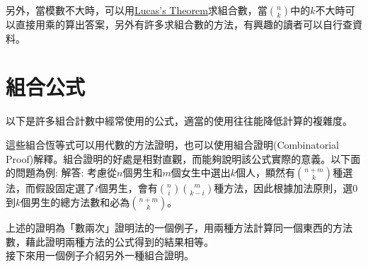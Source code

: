 \documentclass[main.tex]{subfiles}
\begin{document}
另外，當模數不大時，可以用\href{https://en.wikipedia.org/wiki/Lucas\%27s_theorem}{Lucas's Theorem}求組合數，當$\binom{n}{k}$中的$k$不大時可以直接用乘的算出答案，另外有許多求組合數的方法，有興趣的讀者可以自行查資料。

\section{組合公式}
以下是許多組合計數中經常使用的公式，適當的使用往往能降低計算的複雜度。

這些組合恆等式可以用代數的方法證明，也可以使用組合證明(Combinatorial Proof)解釋。組合證明的好處是相對直觀，而能夠說明該公式實際的意義。以下面的問題為例:
解答: 考慮從$n$個男生和$m$個女生中選出$k$個人，顯然有$\binom{n+m}{k}$種選法，而假設固定選了$i$個男生，會有$\binom{n}{i}\binom{m}{k-i}$種方法，因此根據加法原則，選$0$到$k$個男生的總方法數和必為$\binom{n+m}{k}$。
\par 上述的證明為「數兩次」證明法的一個例子，用兩種方法計算同一個東西的方法數，藉此證明兩種方法的公式得到的結果相等。\\
接下來用一個例子介紹另外一種組合證明。
\end{document}
